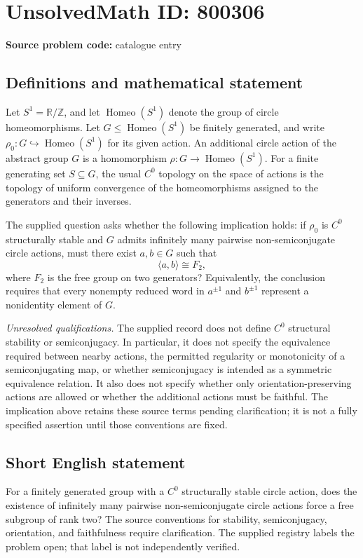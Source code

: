 \documentclass[11pt]{article}
\newcommand{\Z}{\mathbb{Z}}
\newcommand{\R}{\mathbb{R}}
\begin{document}
\section*{UnsolvedMath ID: 800306}
\textbf{Source problem code:} catalogue entry
\subsection{Definitions and mathematical statement}
Let \(S^1=\R/\Z\), and let \(\operatorname{Homeo}(S^1)\) denote the group of circle homeomorphisms. Let \(G\leq\operatorname{Homeo}(S^1)\) be finitely generated, and write \(\rho_0:G\hookrightarrow\operatorname{Homeo}(S^1)\) for its given action. An additional circle action of the abstract group \(G\) is a homomorphism \(\rho:G\to\operatorname{Homeo}(S^1)\). For a finite generating set \(S\subseteq G\), the usual \(C^0\) topology on the space of actions is the topology of uniform convergence of the homeomorphisms assigned to the generators and their inverses.

The supplied question asks whether the following implication holds: if \(\rho_0\) is \(C^0\) structurally stable and \(G\) admits infinitely many pairwise non-semiconjugate circle actions, must there exist \(a,b\in G\) such that
\[
\langle a,b\rangle\cong F_2,
\]
where \(F_2\) is the free group on two generators? Equivalently, the conclusion requires that every nonempty reduced word in \(a^{\pm1}\) and \(b^{\pm1}\) represent a nonidentity element of \(G\).

\emph{Unresolved qualifications.} The supplied record does not define \(C^0\) structural stability or semiconjugacy. In particular, it does not specify the equivalence required between nearby actions, the permitted regularity or monotonicity of a semiconjugating map, or whether semiconjugacy is intended as a symmetric equivalence relation. It also does not specify whether only orientation-preserving actions are allowed or whether the additional actions must be faithful. The implication above retains these source terms pending clarification; it is not a fully specified assertion until those conventions are fixed.
\subsection{Short English statement}
For a finitely generated group with a \(C^0\) structurally stable circle action, does the existence of infinitely many pairwise non-semiconjugate circle actions force a free subgroup of rank two? The source conventions for stability, semiconjugacy, orientation, and faithfulness require clarification. The supplied registry labels the problem open; that label is not independently verified.
\end{document}
